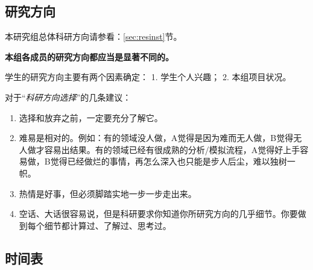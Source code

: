 \documentclass[
]{book}
\providecommand{\tightlist}{%
  \setlength{\itemsep}{0pt}\setlength{\parskip}{0pt}}
\begin{document}
\hypertarget{ux7814ux7a76ux65b9ux5411}{%
\subsection{研究方向}\label{ux7814ux7a76ux65b9ux5411}}

本研究组总体科研方向请参看：\ref{sec:resinst}节。

\textbf{本组各成员的研究方向都应当是显著不同的。}

学生的研究方向主要有两个因素确定：
1. 学生个人兴趣；
2. 本组项目状况。

对于``\emph{科研方向选择}''的几条建议：

\begin{enumerate}
\def\labelenumi{\arabic{enumi}.}
\tightlist
\item
  选择和放弃之前，一定要充分了解它。
\item
  难易是相对的。例如：有的领域没人做，A觉得是因为难而无人做，B觉得无人做才容易出结果。有的领域已经有很成熟的分析/模拟流程，A觉得好上手容易做，B觉得已经做烂的事情，再怎么深入也只能是步人后尘，难以独树一帜。
\item
  热情是好事，但必须脚踏实地一步一步走出来。
\item
  空话、大话很容易说，但是科研要求你知道你所研究方向的几乎细节。你要做到每个细节都计算过、了解过、思考过。
\end{enumerate}

\hypertarget{ux65f6ux95f4ux8868}{%
\subsection{时间表}\label{ux65f6ux95f4ux8868}}
\end{document}
